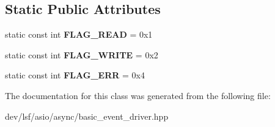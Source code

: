 \subsection*{Static Public Attributes}
\begin{DoxyCompactItemize}
\item 
\hypertarget{classlsf_1_1asio_1_1async_1_1BasicEventDriver_ab8f3869227e4e2988e9e08a0949171f5}{
static const int {\bfseries FLAG\_\-READ} = 0x1}
\label{classlsf_1_1asio_1_1async_1_1BasicEventDriver_ab8f3869227e4e2988e9e08a0949171f5}

\item 
\hypertarget{classlsf_1_1asio_1_1async_1_1BasicEventDriver_a91bcb0fa7689179b8b8b3ad09a79e329}{
static const int {\bfseries FLAG\_\-WRITE} = 0x2}
\label{classlsf_1_1asio_1_1async_1_1BasicEventDriver_a91bcb0fa7689179b8b8b3ad09a79e329}

\item 
\hypertarget{classlsf_1_1asio_1_1async_1_1BasicEventDriver_a16c7ffdeb346170d8cd90d197c8f7879}{
static const int {\bfseries FLAG\_\-ERR} = 0x4}
\label{classlsf_1_1asio_1_1async_1_1BasicEventDriver_a16c7ffdeb346170d8cd90d197c8f7879}

\end{DoxyCompactItemize}


The documentation for this class was generated from the following file:\begin{DoxyCompactItemize}
\item 
dev/lsf/asio/async/basic\_\-event\_\-driver.hpp\end{DoxyCompactItemize}
